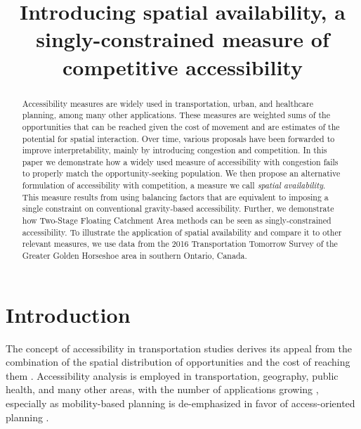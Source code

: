 \documentclass[]{elsarticle} %
\begin{document}
\begin{frontmatter}

  \title{Introducing spatial availability, a singly-constrained measure
of competitive accessibility}
  
  \begin{abstract}
  Accessibility measures are widely used in transportation, urban, and
  healthcare planning, among many other applications. These measures are
  weighted sums of the opportunities that can be reached given the cost
  of movement and are estimates of the potential for spatial
  interaction. Over time, various proposals have been forwarded to
  improve interpretability, mainly by introducing congestion and
  competition. In this paper we demonstrate how a widely used measure of
  accessibility with congestion fails to properly match the
  opportunity-seeking population. We then propose an alternative
  formulation of accessibility with competition, a measure we call
  \emph{spatial availability}. This measure results from using balancing
  factors that are equivalent to imposing a single constraint on
  conventional gravity-based accessibility. Further, we demonstrate how
  Two-Stage Floating Catchment Area methods can be seen as
  singly-constrained accessibility. To illustrate the application of
  spatial availability and compare it to other relevant measures, we use
  data from the 2016 Transportation Tomorrow Survey of the Greater
  Golden Horseshoe area in southern Ontario, Canada.
  \end{abstract}
  
 \end{frontmatter}

\newpage

\hypertarget{introduction}{%
\section{Introduction}\label{introduction}}

The concept of accessibility in transportation studies derives its
appeal from the combination of the spatial distribution of opportunities
and the cost of reaching them \citep{hansen1959, handy_measuring_1997}.
Accessibility analysis is employed in transportation, geography, public
health, and many other areas, with the number of applications growing
\citep{shi_literature_2020}, especially as mobility-based planning is
de-emphasized in favor of access-oriented planning
\citep{deboosere2018, handy2020, proffitt2017, yan2021}.
\end{document}
